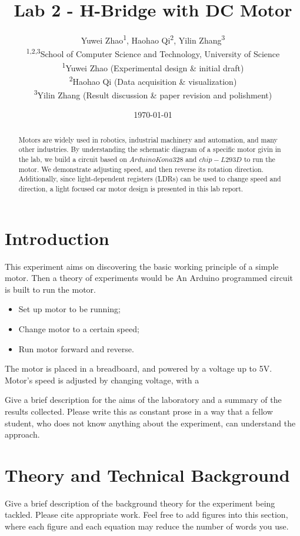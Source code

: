\documentclass[12pt]{article}
\title{\fontsize{16pt}{18pt}\selectfont\textbf{Lab 2 - H-Bridge with DC Motor}}
\author{\fontsize{11pt}{13pt}\selectfont
  Yuwei Zhao\textsuperscript{1},
  Haohao Qi\textsuperscript{2},
  Yilin Zhang\textsuperscript{3} \\
  \small\textsuperscript{1,2,3}School of Computer Science and Technology, University of Science \\
  \small\textsuperscript{1}Yuwei Zhao (Experimental design \& initial draft) \\
  \small\textsuperscript{2}Haohao Qi (Data acquisition \& visualization) \\
  \small\textsuperscript{3}Yilin Zhang (Result discussion \& paper revision and polishment)
}
\date{\fontsize{11pt}{13pt}\selectfont\today}
\begin{document}
\maketitle
\thispagestyle{fancy}
\vspace*{-0.5em}

\begin{abstract} 
\noindent Motors are widely used in robotics, industrial machinery and automation, and many other industries. 
By understanding the schematic diagram of a specific motor givin in the lab, 
we build a circuit based on $Arduino Kona328$ and $chip-L293D$ to run the motor.
We demonstrate adjusting speed, and then reverse its rotation direction. 
Additionally, since light-dependent registers (LDRs) can be used to change speed and direction, 
a light focused car motor design is presented in this lab report.
\end{abstract}

\bigskip

\section*{Introduction}
This experiment aims on discovering the basic working principle of a simple motor. 
Then a theory of experiments would be 
An Arduino programmed circuit is built to run the motor. 
\begin{itemize}
  \item Set up motor to be running;
  \item Change motor to a certain speed;
  \item Run motor forward and reverse.
\end{itemize}
The motor is placed in a breadboard, and powered by a voltage up to 5V.
Motor's speed is adjusted by changing voltage, with a 

Give a brief description for the aims of the laboratory and a summary of the results collected.
Please write this as constant prose in a way that a fellow student,
who does not know anything about the experiment,
can understand the approach.

\section*{Theory and Technical Background}
Give a brief description of the background theory for the experiment being tackled.
Please cite appropriate work.
Feel free to add figures into this section, where
each figure and each equation may reduce the number of words you use.
\end{document}
